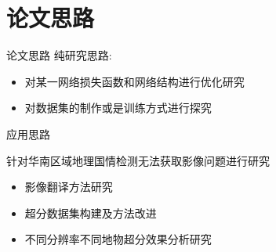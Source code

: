 \section{论文思路}

\begin{frame}{论文思路}
    纯研究思路:
    \begin{itemize}
        \item 对某一网络损失函数和网络结构进行优化研究
        \item 对数据集的制作或是训练方式进行探究
    \end{itemize}
    \vspace{0.5cm}
    应用思路
    
    针对华南区域地理国情检测无法获取影像问题进行研究
    \begin{itemize}
        \item 影像翻译方法研究
        \item 超分数据集构建及方法改进
        \item 不同分辨率不同地物超分效果分析研究
    \end{itemize}
\end{frame}
